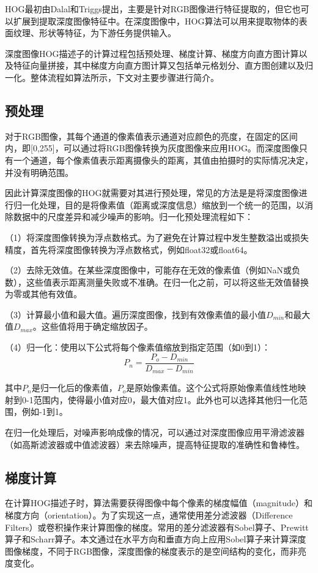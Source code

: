HOG最初由Dalal和Triggs提出\cite{dalalHistogramsOrientedGradients2005}，主要是针对RGB图像进行特征提取的，但它也可以扩展到提取深度图像特征中。在深度图像中，HOG算法可以用来提取物体的表面纹理、形状等特征，为下游任务提供输入。

深度图像HOG描述子的计算过程包括预处理、梯度计算、梯度方向直方图计算以及特征向量拼接，其中梯度方向直方图计算又包括单元格划分、直方图创建以及归一化。整体流程如算法所示，下文对主要步骤进行简介。

\subsection{预处理}

对于RGB图像，其每个通道的像素值表示通道对应颜色的亮度，在固定的区间内，即[0,255]，可以通过将RGB图像转换为灰度图像来应用HOG。而深度图像只有一个通道，每个像素值表示距离摄像头的距离，其值由拍摄时的实际情况决定，并没有明确范围。

因此计算深度图像的HOG就需要对其进行预处理，常见的方法是是将深度图像进行归一化处理，目的是将像素值（距离或深度信息）缩放到一个统一的范围，以消除数据中的尺度差异和减少噪声的影响。归一化预处理流程如下：

（1）将深度图像转换为浮点数格式。为了避免在计算过程中发生整数溢出或损失精度，首先将深度图像转换为浮点数格式，例如float32或float64。

（2）去除无效值。在某些深度图像中，可能存在无效的像素值（例如NaN或负数），这些值表示距离测量失败或不准确。在归一化之前，可以将这些无效值替换为零或其他有效值。

（3）计算最小值和最大值。遍历深度图像，找到有效像素值的最小值$D_{min}$和最大值$D_{max}$。这些值将用于确定缩放因子。

（4）归一化：使用以下公式将每个像素值缩放到指定范围（如0到1）：
$$
P_{n} = \frac{P_{o} - D_{min} }{D_{max}-D_{min}}
$$

其中$P_{n}$是归一化后的像素值，$P_{o}$是原始像素值。这个公式将原始像素值线性地映射到0-1范围内，使得最小值对应0，最大值对应1。此外也可以选择其他归一化范围，例如-1到1。

在归一化处理后，对噪声影响成像的情况，可以通过对深度图像应用平滑滤波器（如高斯滤波器或中值滤波器）来去除噪声，提高特征提取的准确性和鲁棒性。

\subsection{梯度计算}

在计算HOG描述子时，算法需要获得图像中每个像素的梯度幅值（magnitude）和梯度方向（orientation）。为了实现这一点，通常使用差分滤波器（Difference Filters）或卷积操作来计算图像的梯度。常用的差分滤波器有Sobel算子、Prewitt算子和Scharr算子。本文通过在水平方向和垂直方向上应用Sobel算子来计算深度图像梯度，不同于RGB图像，深度图像的梯度表示的是空间结构的变化，而非亮度变化。

